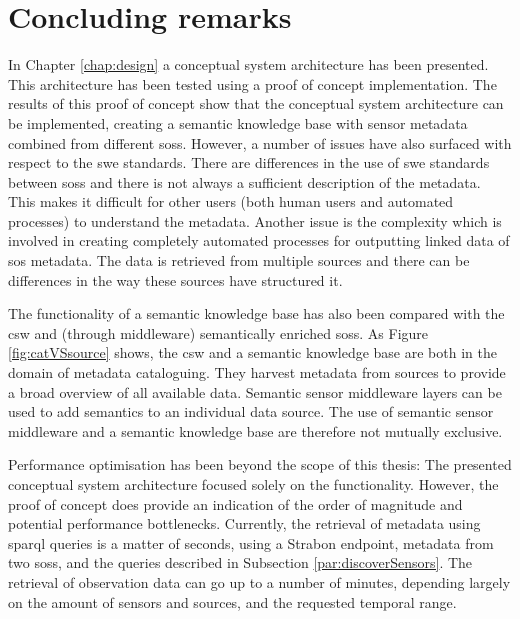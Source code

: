 \section{Concluding remarks}
In Chapter \ref{chap:design} a conceptual system architecture has been presented. This architecture has been tested using a proof of concept implementation. The results of this proof of concept show that the conceptual system architecture can be implemented, creating a semantic knowledge base with sensor metadata combined from different \aclp{sos}. However, a number of issues have also surfaced with respect to the \ac{swe} standards. There are differences in the use of \ac{swe} standards between \aclp{sos} and there is not always a sufficient description of the metadata. This makes it difficult for other users (both human users and automated processes) to understand the metadata. Another issue is the complexity which is involved in creating completely automated processes for outputting linked data of \ac{sos} metadata. The data is retrieved from multiple sources and there can be differences in the way these sources have structured it. 

The functionality of a semantic knowledge base has also been compared with the \ac{csw} and (through middleware) semantically enriched \aclp{sos}. As Figure \ref{fig:catVSsource} shows, the \ac{csw} and a semantic knowledge base are both in the domain of metadata cataloguing. They harvest metadata from sources to provide a broad overview of all available data. Semantic sensor middleware layers can be used to add semantics to an individual data source. The use of semantic sensor middleware and a semantic knowledge base are therefore not mutually exclusive. 

Performance optimisation has been beyond the scope of this thesis: The presented conceptual system architecture focused solely on the functionality. However, the proof of concept does provide an indication of the order of magnitude and potential performance bottlenecks. Currently, the retrieval of metadata using \ac{sparql} queries is a matter of seconds, using a Strabon endpoint, metadata from two \aclp{sos}, and the queries described in Subsection \ref{par:discoverSensors}. The retrieval of observation data can go up to a number of minutes, depending largely on the amount of sensors and sources, and the requested temporal range. 

   
